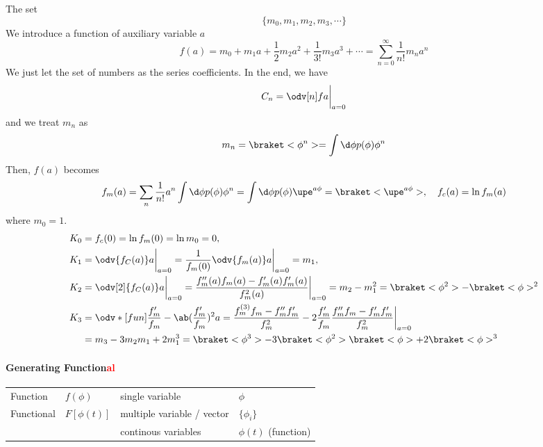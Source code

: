 The set
\[
  \{m_0, m_1, m_2, m_3, \cdots\}
\]
We introduce a function of auxiliary variable $a$
\begin{equation}
  f(a) = m_0 + m_1a + \frac12m_2a^2 + \frac1{3!} m_3a^3 + \cdots
= \sum_{n=0}^\infty \frac1{n!} m_n a^n
\end{equation}
We just let the set of numbers as the series coefficients. In the end, we have
\[
  C_n = \odv[n]fa \bigg|_{a=0}
\]
and we treat $m_n$ as
\begin{equation}
  m_n = \braket<\phi^n> = \int\d\phi p(\phi) \phi^n
\end{equation}
Then, $f(a)$ becomes
\begin{equation}
  f_m(a) = \sum_n \frac1{n!} a^n \int \d\phi p(\phi)\phi^n
= \int\d\phi p(\phi) \upe^{a\phi} = \braket<\upe^{a\phi}>, \quad
  f_c(a) = \ln f_m(a)
\end{equation}
where $m_0 = 1$.
\begin{align*}
  K_0 & = f_c(0) = \ln f_m(0) = \ln m_0 = 0,\\
  K_1 & = \odv{f_C(a)}a \bigg|_{a=0}
= \frac1{f_m(0)} \odv{f_m(a)}a \bigg|_{a=0} = m_1,\\
  K_2 & = \odv[2]{f_C(a)}a\bigg|_{a=0} = \frac{f''_m(a) f_m(a) - f'_m(a) f_m'(a)}{f_m^2(a)}\bigg|_{a=0}
= m_2 - m_1^2 = \braket<\phi^2> - \braket<\phi>^2\\
  K_3 & = \odv*[fun]{\frac{f_m'}{f_m} - \ab(\frac{f_m'}{f_m})^2}a
= \frac{f_m^{(3)}f_m - f_m''f_m'}{f_m^2} - 2\frac{f_m'}{f_m} \frac{f_m''f_m - f_m'f_m'}{f_m^2}\bigg|_{a=0}\\
& = m_3 - 3m_2m_1 + 2m_1^3 = \braket<\phi^3> - 3\braket<\phi^2>\braket<\phi> + 2\braket<\phi>^3
\end{align*}

\paragraph{Generating Function\textcolor{red}{al}}

\begin{center}
  \begin{tabular}{llll}
    \toprule
    Function    & $f(\phi)$    & single variable             & $\phi$\\
    Functional  & $F[\phi(t)]$ & multiple variable / vector  & $\{\phi_i\}$\\
                &           & continous variables         & $\phi(t)$ (function)\\
    \bottomrule
  \end{tabular}
\end{center}


